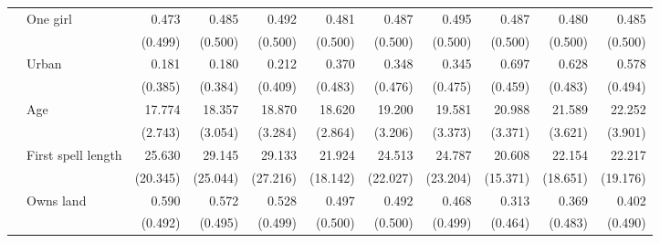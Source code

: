 \begin{table}[htp]
\begin{center}
\begin{scriptsize}
\begin{threeparttable}
\begin{tabular} {@{} c l D{.}{.}{1.3} D{.}{.}{1.3} D{.}{.}{1.3} D{.}{.}{1.3} D{.}{.}{1.3} D{.}{.}{1.3} D{.}{.}{1.3} D{.}{.}{1.3} D{.}{.}{1.3} @{}}
                    & One girl            &       0.473         &       0.485         &       0.492         &       0.481         &       0.487         &       0.495         &       0.487         &       0.480         &       0.485         \\
                    &                     &     (0.499)         &     (0.500)         &     (0.500)         &     (0.500)         &     (0.500)         &     (0.500)         &     (0.500)         &     (0.500)         &     (0.500)         \\
                    & Urban               &       0.181         &       0.180         &       0.212         &       0.370         &       0.348         &       0.345         &       0.697         &       0.628         &       0.578         \\
                    &                     &     (0.385)         &     (0.384)         &     (0.409)         &     (0.483)         &     (0.476)         &     (0.475)         &     (0.459)         &     (0.483)         &     (0.494)         \\
                    & Age                 &      17.774         &      18.357         &      18.870         &      18.620         &      19.200         &      19.581         &      20.988         &      21.589         &      22.252         \\
                    &                     &     (2.743)         &     (3.054)         &     (3.284)         &     (2.864)         &     (3.206)         &     (3.373)         &     (3.371)         &     (3.621)         &     (3.901)         \\
                    & First spell length  &      25.630         &      29.145         &      29.133         &      21.924         &      24.513         &      24.787         &      20.608         &      22.154         &      22.217         \\
                    &                     &    (20.345)         &    (25.044)         &    (27.216)         &    (18.142)         &    (22.027)         &    (23.204)         &    (15.371)         &    (18.651)         &    (19.176)         \\
                    & Owns land           &       0.590         &       0.572         &       0.528         &       0.497         &       0.492         &       0.468         &       0.313         &       0.369         &       0.402         \\
                    &                     &     (0.492)         &     (0.495)         &     (0.499)         &     (0.500)         &     (0.500)         &     (0.499)         &     (0.464)         &     (0.483)         &     (0.490)         \\

\end{tabular}
\end{threeparttable}
\end{scriptsize}
\end{center}
\end{table}
